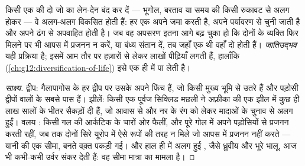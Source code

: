 \begin{proposition}[जातिउद्भव]\label{prop:g12:selection-drift-speciation:speciation}
किसी एक  की दो  जो  का लेन-देन बंद कर दें --- भूगोल,
बरताव या समय की किसी रुकावट से अलग होकर --- वे अलग-अलग विकसित होती हैं: हर
एक अपने  जमा करती है, अपने पर्यावरण से चुनी जाती है और अपने ढंग
से अपवाहित होती है। जब वह अपसरण इतना आगे बढ़ चुका हो कि दोनों  के
व्यक्ति फिर मिलने पर भी आपस में प्रजनन न करें, या बंध्य संतान दें, तब जहाँ
एक  थी वहाँ दो होती हैं। \emph{जातिउद्भव} यही
प्रक्रिया है; इसमें आम तौर पर हज़ारों से लेकर लाखों पीढ़ियाँ लगती हैं,
हालाँकि  (\cref{ch:g12:diversification-of-life}) इसे एक ही में पा
लेती है।
\end{proposition}
\begin{proof}[साक्ष्य]
द्वीप: गैलापागोस के हर द्वीप पर उसके अपने फिंच हैं, जो किसी मुख्य भूमि 
से उतरे हैं और पड़ोसी द्वीपों वालों के सबसे पास हैं। झीलें: किसी एक पूर्वज
सिक्लिड मछली ने अफ़्रीका की एक झील में कुछ ही लाख सालों के भीतर सैकड़ों
 दी हैं, जो आवास से और नर के रंग को लेकर मादाओं के चुनाव से अलग हुईं।
वलय : किसी गल की  आर्कटिक के चारों ओर फैलीं, और पूरे गोल में
अपने पड़ोसियों से प्रजनन करती रहीं, जब तक दोनों सिरे यूरोप में ऐसे रूपों की
तरह न मिले जो आपस में प्रजनन नहीं करते --- यानी  की एक सीमा, बनते वक़्त
पकड़ी गई। और हाल ही में अलग हुई , जैसे ध्रुवीय और भूरे भालू, आज भी
कभी-कभी उर्वर संकर देती हैं: वह सीमा मात्रा का मामला है।
\end{proof}

